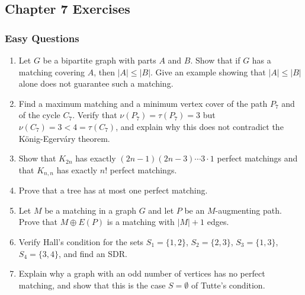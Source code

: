 \documentclass{article}
\theoremstyle{definition}
\begin{document}
\subsection{Chapter 7 Exercises}

\subsubsection{Easy Questions}
\begin{enumerate}
\item Let $G$ be a bipartite graph with parts $A$ and $B$. Show that if $G$ has a matching covering $A$, then $|A| \leq |B|$. Give an example showing that $|A| \leq |B|$ alone does not guarantee such a matching.

\item Find a maximum matching and a minimum vertex cover of the path $P_7$ and of the cycle $C_7$. Verify that $\nu(P_7) = \tau(P_7) = 3$ but $\nu(C_7) = 3 < 4 = \tau(C_7)$, and explain why this does not contradict the König-Egerváry theorem.

\item Show that $K_{2n}$ has exactly $(2n-1)(2n-3)\cdots 3 \cdot 1$ perfect matchings and that $K_{n,n}$ has exactly $n!$ perfect matchings.

\item Prove that a tree has at most one perfect matching.

\item Let $M$ be a matching in a graph $G$ and let $P$ be an $M$-augmenting path. Prove that $M \oplus E(P)$ is a matching with $|M| + 1$ edges.

\item Verify Hall's condition for the sets $S_1 = \{1,2\}$, $S_2 = \{2,3\}$, $S_3 = \{1,3\}$, $S_4 = \{3,4\}$, and find an SDR.

\item Explain why a graph with an odd number of vertices has no perfect matching, and show that this is the case $S = \emptyset$ of Tutte's condition.
\end{enumerate}
\end{document}
